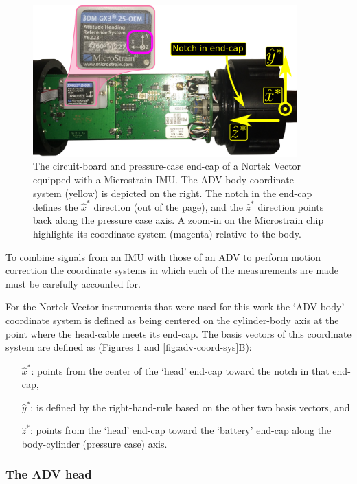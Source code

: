 \documentclass[twocol]{ametsoc}
\begin{document}
\begin{figure}
  \centering
  \includegraphics[width=4in]{IMUtest}
  \caption{The circuit-board and pressure-case end-cap of a Nortek Vector equipped with a Microstrain IMU.  The ADV-body coordinate system (yellow) is depicted on the right. The notch in the end-cap defines the $\hat{x}^*$ direction (out of the page), and the $\hat{z}^*$ direction points back along the pressure case axis. A zoom-in on the Microstrain chip highlights its coordinate system (magenta) relative to the body. }
  \label{fig:imu_orient}
\end{figure}

To combine signals from an IMU with those of an ADV to perform motion correction the coordinate systems in which each of the measurements are made must be carefully accounted for. 

For the Nortek Vector instruments that were used for this work the `ADV-body' coordinate system is defined as being centered on the cylinder-body axis at the point where the head-cable meets its end-cap.  The basis vectors of this coordinate system are defined as (Figures \ref{fig:imu_orient} and \ref{fig:adv-coord-sys}B):
\begin{itemize}
\item[$\hat{x}^*$:] points from the center of the `head' end-cap toward the notch in that end-cap,
\item[$\hat{y}^*$:] is defined by the right-hand-rule based on the other two basis vectors, and
\item[$\hat{z}^*$:] points from the `head' end-cap toward the `battery' end-cap along the body-cylinder (pressure case) axis.
\end{itemize}

\subsubsection{The ADV head}
\end{document}
